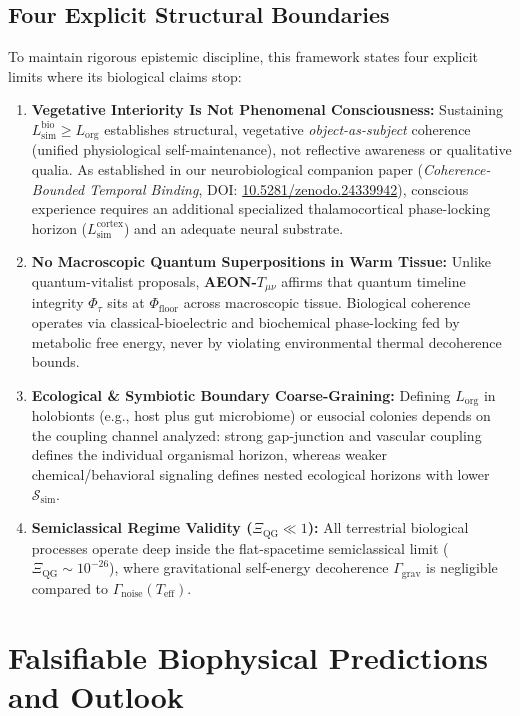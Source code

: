 \documentclass[11pt,a4paper]{article}
\begin{document}
\subsection{Four Explicit Structural Boundaries}

To maintain rigorous epistemic discipline, this framework states four explicit limits where its biological claims stop:
\begin{enumerate}
    \item \textbf{Vegetative Interiority Is Not Phenomenal Consciousness:} Sustaining $L_{\mathrm{sim}}^{\mathrm{bio}} \ge L_{\mathrm{org}}$ establishes structural, vegetative \emph{object-as-subject} coherence (unified physiological self-maintenance), not reflective awareness or qualitative qualia. As established in our neurobiological companion paper (\emph{Coherence-Bounded Temporal Binding}, DOI: \href{https://doi.org/10.5281/zenodo.24339942}{10.5281/zenodo.24339942}), conscious experience requires an additional specialized thalamocortical phase-locking horizon ($L_{\mathrm{sim}}^{\mathrm{cortex}}$) and an adequate neural substrate.
    \item \textbf{No Macroscopic Quantum Superpositions in Warm Tissue:} Unlike quantum-vitalist proposals, \textbf{AEON-$T_{\mu\nu}$} affirms that quantum timeline integrity $\Phi_\tau$ sits at $\Phi_{\mathrm{floor}}$ across macroscopic tissue. Biological coherence operates via classical-bioelectric and biochemical phase-locking fed by metabolic free energy, never by violating environmental thermal decoherence bounds.
    \item \textbf{Ecological & Symbiotic Boundary Coarse-Graining:} Defining $L_{\mathrm{org}}$ in holobionts (e.g., host plus gut microbiome) or eusocial colonies depends on the coupling channel analyzed: strong gap-junction and vascular coupling defines the individual organismal horizon, whereas weaker chemical/behavioral signaling defines nested ecological horizons with lower $\mathcal{S}_{\mathrm{sim}}$.
    \item \textbf{Semiclassical Regime Validity ($\Xi_{\mathrm{QG}} \ll 1$):} All terrestrial biological processes operate deep inside the flat-spacetime semiclassical limit ($\Xi_{\mathrm{QG}} \sim 10^{-26}$), where gravitational self-energy decoherence $\Gamma_{\mathrm{grav}}$ is negligible compared to $\Gamma_{\mathrm{noise}}(T_{\mathrm{eff}})$.
\end{enumerate}

\section{Falsifiable Biophysical Predictions and Outlook}
\end{document}
